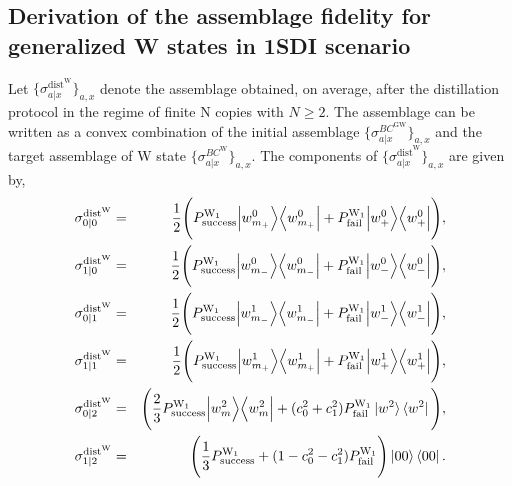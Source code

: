 \documentclass[reprint,superscriptaddress,nofootinbib,amsmath,amssymb,aps,pra,longbibliography]{revtex4-1}
\begin{document}
\begin{widetext}
\section{Derivation of the assemblage fidelity for generalized W states in 1SDI scenario}\label{appnew}

 Let $\{\sigma_{a|x}^{\text{dist}^{\text{W}}}\}_{a,x}$ denote the assemblage obtained, on average, after the distillation protocol in the regime of finite N copies with $N \geq 2$. The assemblage can be written as a convex combination of the initial assemblage $\{\sigma_{a|x}^{BC^{\text{GW}}}\}_{a,x}$ and the target assemblage of W state $\{\sigma_{a|x}^{BC^{\text{W}}}\}_{a,x}$. The components of  $\{\sigma_{a|x}^{\text{dist}^{\text{W}}}\}_{a,x}$  are given by,
\begin{eqnarray}
	\sigma_{0|0}^{\text{dist}^{\text{W}}} &=& \frac{1}{2} \Bigg( P^{\text{W}_1}_{\text{success}}\Big| w_{m_+}^0 \Big\rangle \Big\langle w_{m_+}^0 \Big| + P^{\text{W}_1}_{\text{fail}} \Big| w_+^0 \Big\rangle \Big\langle w_+^0 \Big| \Bigg),\nonumber \\ \sigma_{1|0}^{\text{dist}^{\text{W}}} &=& \frac{1}{2} \Bigg( P^{\text{W}_1}_{\text{success}} \Big| w_{m_-}^0 \Big\rangle \Big\langle w_{m_-}^0 \Big| + P^{\text{W}_1}_{\text{fail}} \Big| w_-^0 \Big\rangle \Big\langle w_-^0 \Big| \Bigg), \nonumber \\
	\sigma_{0|1}^{\text{dist}^{\text{W}}} &=& \frac{1}{2} \Bigg( P^{\text{W}_1}_{\text{success}} \Big| w_{m_-}^1 \Big\rangle \Big\langle w_{m_-}^1 \Big| + P^{\text{W}_1}_{\text{fail}} \Big| w_-^1 \Big\rangle \Big\langle w_-^1 \Big| \Bigg),\nonumber \\ \sigma_{1|1}^{\text{dist}^{\text{W}}} &=& \frac{1}{2} \Bigg( P^{\text{W}_1}_{\text{success}} \Big| w_{m_+}^1 \Big\rangle \Big\langle w_{m_+}^1 \Big| + P^{\text{W}_1}_{\text{fail}}\Big| w_+^1 \Big\rangle \Big\langle w_+^1 \Big| \Bigg), \nonumber \\
	\sigma_{0|2}^{\text{dist}^{\text{W}}} &=& \Bigg(  \frac{2}{3} P^{\text{W}_1}_{\text{success}} \Big| w_{m}^2 \Big\rangle \Big\langle w_m^2 \Big| +  (c_0^2+c_1^2) P^{\text{W}_1}_{\text{fail}}  \ket{w^2}\bra{w^2}\Bigg), \nonumber \\ \sigma_{1|2}^{\text{dist}^{\text{W}}} &=& \Bigg(\frac{1}{3} P^{\text{W}_1}_{\text{success}} + (1-c_0^2-c_1^2) P^{\text{W}_1}_{\text{fail}} \Bigg)\ket{00}\bra{00}.
	\label{Wdistill}
\end{eqnarray}


\end{widetext}
\end{document}
